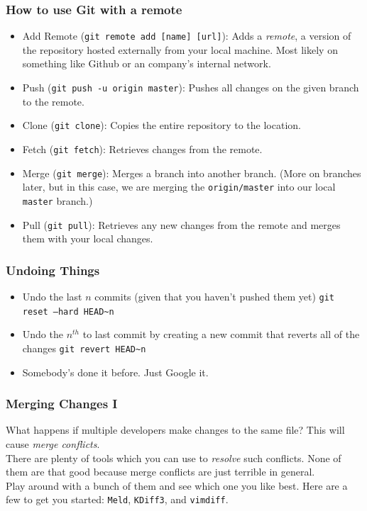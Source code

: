 \documentclass{beeper}
\begin{document}
\begin{frame}
    \frametitle{How to use Git with a remote}

    \begin{itemize}
        \item Add Remote (\texttt{git remote add [name] [url]}): Adds a
            \textit{remote}, a version of the repository hosted externally from
            your local machine. Most likely on something like Github or an
            company's internal network.
        \item Push (\texttt{git push -u origin master}): Pushes all changes on
            the given branch to the remote.
        \item Clone (\texttt{git clone}): Copies the entire repository to the
            location.
        \item Fetch (\texttt{git fetch}): Retrieves changes from the remote.
        \item Merge (\texttt{git merge}): Merges a branch into another branch.
            (More on branches later, but in this case, we are merging the
            \texttt{origin/master} into our local \texttt{master} branch.)
        \item Pull (\texttt{git pull}): Retrieves any new changes from the
            remote and merges them with your local changes.
    \end{itemize}
\end{frame}

\begin{frame}
    \frametitle{Undoing Things}

    \begin{itemize}
        \item Undo the last $n$ commits (given that you haven't pushed them yet)
            \texttt{git reset --hard HEAD\textasciitilde n}
        \item Undo the $n^{th}$ to last commit by creating a new commit that
            reverts all of the changes \texttt{git revert HEAD\textasciitilde n}
        \item Somebody's done it before. Just Google it.
    \end{itemize}
\end{frame}

\begin{frame}
    \frametitle{Merging Changes I}

    What happens if multiple developers make changes to the same file? This will
    cause \textit{merge conflicts}.\\

    There are plenty of tools which you can use to \textit{resolve} such
    conflicts. None of them are that good because merge conflicts are just
    terrible in general.\\

    Play around with a bunch of them and see which one you like best. Here are a
    few to get you started: \texttt{Meld}, \texttt{KDiff3}, and
    \texttt{vimdiff}.\\
\end{frame}
\end{document}
